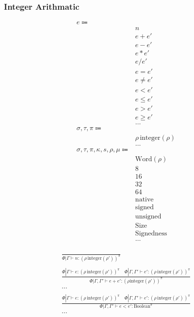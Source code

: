 \documentclass {article}
\begin{document}
\subsubsection{Integer Arithmatic}
\begin{align*}
e \Coloneqq & \\
& n \tag{Numeric Literal} \\
& e + e' \tag{Addition} \\
& e - e' \tag{Subtraction} \\
& e * e' \tag{Multiplication} \\
& e / e' \tag{Division} \\
& e = e' \tag {Equality} \\
& e \neq e' \tag {Inequality} \\
& e < e' \tag {Less Then} \\
& e \leq e' \tag {Less Then Equal} \\
& e > e' \tag {Greater Then} \\
& e \geq e' \tag {Greater Then Equal} \\
& \dots \\
\sigma, \tau, \pi \Coloneqq & \\
& \rho \, \text{integer}(\rho) \tag{Number} \\
& \dots \\
\sigma, \tau, \pi, \kappa, s, \rho, \mu \Coloneqq & \\
& \text{Word} (\rho) \tag{Word Representation} \\
& 8 \tag{Byte Size} \\
& 16 \tag{Short Size} \\
& 32 \tag{Int Size} \\
& 64 \tag{Long Size} \\
& \text{native} \tag{Native Size} \\
& \text{signed} \tag{Signed} \\
& \text{unsigned} \tag{Unsigned} \\
& \text{Size} \tag{Size Sort}\\
& \text{Signedness} \tag{Signedness Sort}\\
& \dots \\
\end{align*}

\begin{gather*}
\frac
{}
{\Phi | \Gamma \vdash n : (\rho \, \text{integer}(\rho'))^\pi} \\
\\
\frac
{\Phi | \Gamma \vdash e : (\rho \, \text{integer}(\rho'))^\pi \quad \Phi | \Gamma, \Gamma' \vdash e' : (\rho \, \text{integer}(\rho'))^\pi}
{\Phi | \Gamma, \Gamma' \vdash e + e' : (\rho \text{integer}(\rho'))^\pi} \\
\dots \\
\\
\frac
{\Phi | \Gamma \vdash e : (\rho \, \text{integer}(\rho'))^\pi \quad \Phi | \Gamma, \Gamma' \vdash e' : (\rho \, \text{integer}(\rho'))^\pi}
{\Phi | \Gamma, \Gamma' \vdash e < e' : \text{Boolean}^\pi} \\
\dots
\end{gather*}
\end{document}
